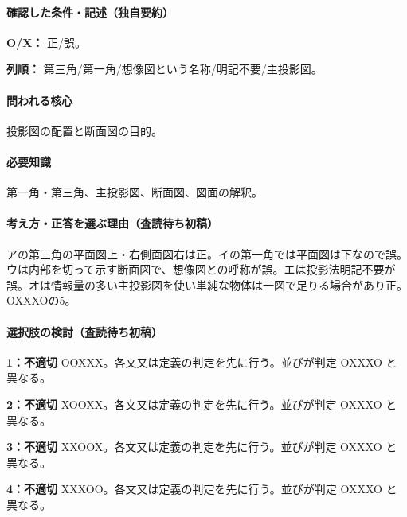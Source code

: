 \paragraph{確認した条件・記述（独自要約）}\mbox{}\par

\noindent\textbf{O/X：} 正/誤。\par

\noindent\textbf{列順：} 第三角/第一角/想像図という名称/明記不要/主投影図。\par

\paragraph{問われる核心} 投影図の配置と断面図の目的。

\paragraph{必要知識} 第一角・第三角、主投影図、断面図、図面の解釈。

\paragraph{考え方・正答を選ぶ理由（査読待ち初稿）} アの第三角の平面図上・右側面図右は正。イの第一角では平面図は下なので誤。ウは内部を切って示す断面図で、想像図との呼称が誤。エは投影法明記不要が誤。オは情報量の多い主投影図を使い単純な物体は一図で足りる場合があり正。OXXXOの5。

\paragraph{選択肢の検討（査読待ち初稿）}\mbox{}\par

\noindent\textbf{1：不適切} OOXXX。各文又は定義の判定を先に行う。並びが判定 OXXXO と異なる。\par

\noindent\textbf{2：不適切} XOOXX。各文又は定義の判定を先に行う。並びが判定 OXXXO と異なる。\par

\noindent\textbf{3：不適切} XXOOX。各文又は定義の判定を先に行う。並びが判定 OXXXO と異なる。\par

\noindent\textbf{4：不適切} XXXOO。各文又は定義の判定を先に行う。並びが判定 OXXXO と異なる。\par

